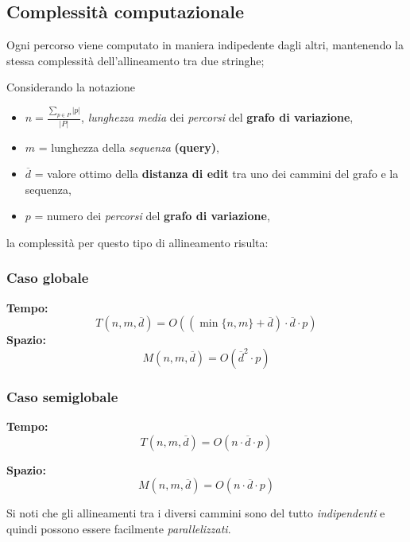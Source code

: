 \subsection{Complessità computazionale}
    Ogni percorso viene computato in maniera indipedente dagli altri, mantenendo la stessa complessità dell'allineamento tra due stringhe;
    
    Considerando la notazione 
    \begin{itemize}
        \item $n = \frac{\sum_{p \in P}{\lvert p \rvert}}{\lvert P \rvert}$, \emph{lunghezza media} dei \emph{percorsi} del \textbf{grafo di variazione},
        \item $m$ = lunghezza della \emph{sequenza} \textbf{(query)},
        \item $\overline{d}$ = valore ottimo della \textbf{distanza di edit} tra uno dei cammini del grafo e la sequenza,
        \item $p$ = numero dei \emph{percorsi} del \textbf{grafo di variazione},
    \end{itemize}
    la complessità per questo tipo di allineamento risulta:

\subsubsection{Caso globale}
    \textbf{Tempo:}
    \begin{equation}
            T(n, m, \overline{d}) = O((\min\{n, m\} + \overline{d}) \cdot \overline{d} \cdot p)
        \label{equation:wfa_variation_global_time_complexity}
        \end{equation}
    \textbf{Spazio:}
    \begin{equation}
        M(n , m, \overline{d}) = O(\overline{d}^2 \cdot p)
    \label{equation:wfa_variation_global_space_complexity}
    \end{equation}
        
\subsubsection{Caso semiglobale}
    \textbf{Tempo:}
    \begin{equation}
        T(n, m, \overline{d}) = O(n \cdot \overline{d} \cdot p)
    \label{equation:wfa_variation_semiglobal_time_complexity}
    \end{equation}

    \textbf{Spazio:}
    \begin{equation}
        M(n , m, \overline{d}) = O(n \cdot \overline{d} \cdot p)
    \label{equation:wfa_variation_semiglobal_space_complexity}
    \end{equation}

    Si noti che gli allineamenti tra i diversi cammini sono del tutto \emph{indipendenti} e quindi possono essere facilmente \emph{parallelizzati}.